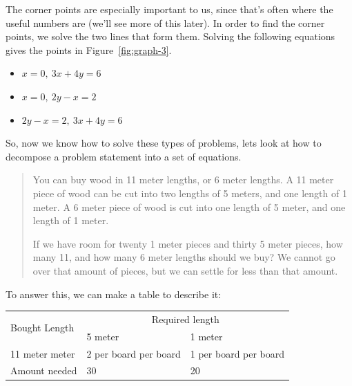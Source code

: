 The corner points are especially important to us, since that's often where the
useful numbers are (we'll see more of this later). In order to find the corner
points, we solve the two lines that form them. Solving the following equations
gives the points in Figure~\ref{fig:graph-3}.

\begin{mymulticols}
  \begin{itemize}
    \item $x = 0,~3x + 4y = 6$
    \item $x = 0,~2y - x = 2$
    \item $2y - x = 2,~3x + 4y = 6$
  \end{itemize}
\end{mymulticols}

So, now we know how to solve these types of problems, lets look at how to
decompose a problem statement into a set of equations.

\begin{quote}

  You can buy wood in 11 meter lengths, or 6 meter lengths. A 11 meter piece of
  wood can be cut into two lengths of 5 meters, and one length of 1 meter. A 6
  meter piece of wood is cut into one length of 5 meter, and one length of 1
  meter.

  If we have room for twenty 1 meter pieces and thirty 5 meter pieces, how many
  11, and how many 6 meter lengths should we buy? We cannot go over that amount
  of pieces, but we can settle for less than that amount.

\end{quote}

To answer this, we can make a table to describe it:

\begin{center}
  \begin{tabular} {|p{3cm}|p{2cm}|p{2cm}|}
    \hline
    \multirow{2}{*}{Bought Length} & \multicolumn{2}{c|}{Required length}\\
    \cline{2-3}
    & 5 meter & 1 meter\\ \hline
    11 meter\newline 6 meter & 2 per board\newline 1 per board & 1 per
    board\newline 1 per board\\ \hline
    Amount needed & 30 & 20\\ \hline
  \end{tabular}
\end{center}

